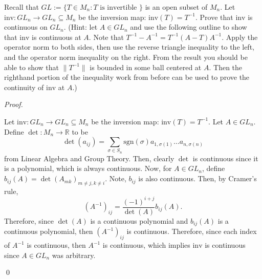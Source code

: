 \documentclass[12pt]{article}
\newenvironment{problem}[2][Problem]{\begin{trivlist}
\item[\hskip \labelsep {\bfseries #1}\hskip \labelsep {\bfseries
#2.}]}{\end{trivlist}}
\newenvironment{sol}
    {\emph{Proof.}
    }
    {
    \qed
    }
\begin{document}
  \begin{problem}{15}
  Recall that $GL := \{T \in M_n : T \text{ is invertible }\}$ is an open subset of $M_n$. Let $\text{inv} : GL_n \to GL_n \subseteq M_n$ be the inversion map: $\text{inv}(T) = T^{-1}$. Prove that $\text{inv}$ is continuous on $GL_n$. (Hint: let $A \in GL_n$ and use the following outline to show that $\text{inv}$ is continuous at $A$. Note that $T^{-1} - A^{-1} = T^{-1}(A - T)A^{-1}$. Apply the operator norm to both sides, then use the reverse triangle inequality to the left, and the operator norm inequality on the right. From the result you should be able to show that $\lVert T^{-1} \rVert$ is bounded in some ball centered at $A$. Then the righthand portion of the inequality work from before can be used to prove the continuity of $\text{inv}$ at $A$.) 
  \end{problem}
  \begin{sol}
  Let $\text{inv} : GL_n \to GL_n \subseteq M_n$ be the inversion map: $\text{inv}(T) = T^{-1}$. Let $A \in GL_n$. Define $\det: M_n \to \mathbb{R}$ to be $$\det(a_{ij}) = \sum_{\sigma \in S_n}\text{sgn}(\sigma)a_{1,\sigma(1)} \dots a_{n,\sigma(n)}$$ from Linear Algebra and Group Theory. Then, clearly $\det$ is continuous since it is a polynomial, which is always continuous. Now, for $A \in GL_n$, define $b_{ij}(A) = \det(A_{mk})_{m \neq j, k \neq i}$. Note, $b_{ij}$ is also continuous. Then, by Cramer's rule, $$(A^{-1})_{ij} = \frac{(-1)^{i+j}}{\det(A)}b_{ij}(A).$$ Therefore, since $\det(A)$ is a continuous polynomial and $b_{ij}(A)$ is a continuous polynomial, then $(A^{-1})_{ij}$ is continuous. Therefore, since each index of $A^{-1}$ is continuous, then $A^{-1}$ is continuous, which implies $\text{inv}$ is continuous since $A \in GL_n$ was arbitrary.
  \end{sol}
  
\end{document}
